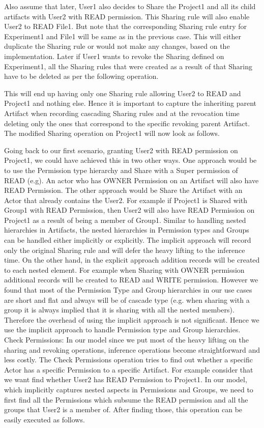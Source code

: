 \documentclass[sigconf]{acmart}
\begin{document}
Also assume that later, User1 also decides to Share the Project1 and all its child artifacts with User2 with READ permission. This Sharing rule will also enable User2 to READ File1. But note that the corresponding Sharing rule entry for Experiment1 and File1 will be same as in the previous case. This will either duplicate the Sharing rule or would not make any changes, based on the implementation. Later if User1 wants to revoke the Sharing defined on Experiment1, all the Sharing rules that were created as a result of that Sharing have to be deleted as per the following operation.

This will end up having only one Sharing rule allowing User2 to READ and Project1 and nothing else. Hence it is important to capture the inheriting parent Artifact when recording cascading Sharing rules and at the revocation time deleting only the ones that correspond to the specific revoking parent Artifact. The modified Sharing operation on Project1 will now look as follows.

Going back to our first scenario, granting User2 with READ permission on Project1, we could have achieved this in two other ways. One approach would be to use the Permission type hierarchy and Share with a Super permission of READ (e.g). An actor who has OWNER Permission on an Artifact will also have READ Permission. The other approach would be Share the Artifact with an Actor that already contains the User2. For example if Project1 is Shared with Group1 with READ Permission, then User2 will also have READ Permission on Project1 as a result of being a member of Group1. Similar to handling nested hierarchies in Artifacts, the nested hierarchies in Permission types and Groups can be handled either implicitly or explicitly. The implicit approach will record only the original Sharing  rule and will defer the heavy lifting to the inference time. On the other hand, in the explicit approach addition records will be created to each nested element. For example when Sharing with OWNER permission additional records will be created to READ and WRITE permission. However we found that most of the Permission Type and Group hierarchies in our use cases are short and flat and always will be of cascade type (e.g. when sharing with a group it is always implied that it is sharing with all the nested members). Therefore the overhead of using the implicit approach is not significant. Hence we use the implicit approach to handle Permission type and Group hierarchies.
Check Permissions: In our model since we put most of the heavy lifting on the sharing and revoking operations, inference operations become straightforward and less costly. The Check Permissions operation tries to find out whether a specific Actor has a specific Permission to a specific Artifact. For example consider that we want find whether User2 has READ Permission to Project1. In our model, which implicitly captures nested aspects in Permissions and Groups, we need to first find all the Permissions which subsume the READ permission and all the groups that User2 is a member of. After finding those, this operation can be easily executed as follows.
\end{document}
